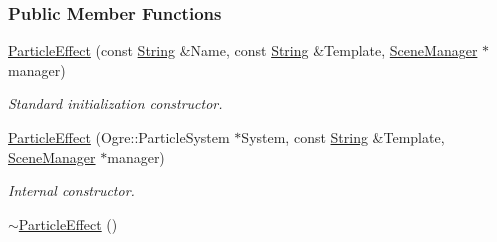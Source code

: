 \subsubsection*{Public Member Functions}
\begin{DoxyCompactItemize}
\item 
\hyperlink{classphys_1_1ParticleEffect_a42d17b7cd81968603c70920c30e6f812}{ParticleEffect} (const \hyperlink{namespacephys_aa03900411993de7fbfec4789bc1d392e}{String} \&Name, const \hyperlink{namespacephys_aa03900411993de7fbfec4789bc1d392e}{String} \&Template, \hyperlink{classphys_1_1SceneManager}{SceneManager} $\ast$manager)
\begin{DoxyCompactList}\small\item\em Standard initialization constructor. \item\end{DoxyCompactList}\item 
\hyperlink{classphys_1_1ParticleEffect_aaf5a40f8c22ca3cd01f0feeb08b8308b}{ParticleEffect} (Ogre::ParticleSystem $\ast$System, const \hyperlink{namespacephys_aa03900411993de7fbfec4789bc1d392e}{String} \&Template, \hyperlink{classphys_1_1SceneManager}{SceneManager} $\ast$manager)
\begin{DoxyCompactList}\small\item\em Internal constructor. \item\end{DoxyCompactList}\item 
\hypertarget{classphys_1_1ParticleEffect_a8c9c3d0cd1d02acdc626266ee485f51f}{
\hyperlink{classphys_1_1ParticleEffect_a8c9c3d0cd1d02acdc626266ee485f51f}{$\sim$ParticleEffect} ()}
\label{d2/d69/classphys_1_1ParticleEffect_a8c9c3d0cd1d02acdc626266ee485f51f}


\end{DoxyCompactItemize}
